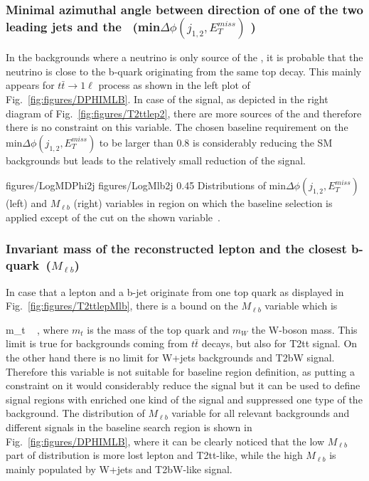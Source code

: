 \subsubsection{Minimal azimuthal angle between direction of one of the two leading jets and the \MET~(min$\Delta \phi (j_{1,2}, E_{T}^{miss})$ )}

In the backgrounds where a neutrino is only source of the \MET, it is probable that the neutrino is close to the b-quark  originating from the same top decay. This mainly appears for $t\bar{t} \to 1\ell$ process as shown in the left plot of Fig.~\ref{fig:figures/DPHIMLB}. In case of the signal, as depicted in the right diagram of Fig.~\ref{fig:figures/T2ttlep2}, there are more sources of the \MET and therefore there is no constraint on this variable. The chosen baseline requirement on the min$\Delta \phi (j_{1,2}, E_{T}^{miss})$ to be larger than 0.8 is considerably reducing the SM backgrounds but leads to the relatively small reduction of the signal.

                 {figures/LogMDPhi2j} %
                 {figures/LogMlb2j} %
                 {0.45}       %
                 { Distributions of min$\Delta \phi (j_{1,2}, E_{T}^{miss})$ (left) and $M_{\ell b}$ (right) variables in region on which the baseline selection is applied except of the cut on the shown variable~\cite{website:stopSupp}. }

\subsubsection{Invariant mass of the reconstructed lepton and the closest b-quark~($M_{\ell b}$)}

In case that a lepton and a b-jet originate from one top quark as displayed in Fig.~\ref{fig:figures/T2ttlepMlb}, there is a bound on the $M_{\ell b}$ variable which is

{
 m_{t}  ~ ,
}
where $m_{t}$ is the mass of the top quark and $m_{W}$ the W-boson mass. This limit is true for backgrounds coming from $t\bar{t}$ decays, but also for T2tt signal. On the other hand there is no limit for W+jets backgrounds and T2bW signal. Therefore this variable is not suitable for baseline region definition, as putting a constraint on it would considerably reduce the signal but it can be used to define signal regions with enriched one kind of the signal and suppressed one type of the background. The distribution of  $M_{\ell b}$ variable for all relevant backgrounds and different signals in the baseline search region is shown in Fig.~\ref{fig:figures/DPHIMLB}, where it can be clearly noticed that the low $M_{\ell b}$ part of distribution is more lost lepton and T2tt-like, while the high $M_{\ell b}$ is mainly populated by W+jets and T2bW-like signal.

